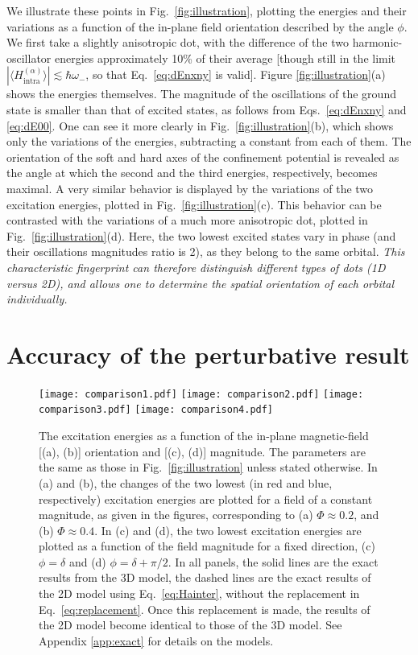 \documentclass[aps,floatfix,twocolumn,showpacs,10pt,nofootinbib]{revtex4-1}
\begin{document}
We illustrate these points in Fig.~\ref{fig:illustration}, plotting the energies and their variations as a function of the in-plane field orientation described by the angle $\phi$. We first take a slightly anisotropic dot, with the difference of the two harmonic-oscillator energies approximately 10\% of their average [though still in the limit $|\langle H^{(\alpha)}_\textrm{intra} \rangle |\lesssim \hbar \omega_-$, so that Eq.~\eqref{eq:dEnxny} is valid]. Figure \ref{fig:illustration}(a) shows the energies themselves. The magnitude of the oscillations of the ground state is smaller than that of excited states, as follows from Eqs.~\eqref{eq:dEnxny} and \eqref{eq:dE00}. One can see it more clearly in Fig.~\ref{fig:illustration}(b), which shows only the variations of the energies, subtracting a constant from each of them. The orientation of the  soft and hard axes of the confinement potential is revealed as the angle at which the second and the third energies, respectively, becomes maximal.
A very similar behavior is displayed by the variations of the two excitation energies, plotted in Fig.~\ref{fig:illustration}(c). This behavior can be contrasted with the variations of a much more anisotropic dot, plotted in Fig.~\ref{fig:illustration}(d). Here, the two lowest excited states vary in phase (and their oscillations magnitudes ratio is 2), as they belong to the same orbital. \textit{This characteristic fingerprint can therefore distinguish different types of dots (1D versus 2D), and allows one to determine the spatial orientation of each orbital individually.\cite{yu}}


\section{Accuracy of the perturbative result}

\begin{figure}
\texttt{[image: comparison1.pdf]}
\texttt{[image: comparison2.pdf]}
\texttt{[image: comparison3.pdf]}
\texttt{[image: comparison4.pdf]}
\caption{\label{fig:comparison}
The excitation energies as a function of the in-plane magnetic-field [(a), (b)] orientation and [(c), (d)] magnitude. The parameters are the same as those in Fig.~\ref{fig:illustration} unless stated otherwise. In (a) and (b), the changes of the two lowest (in red and blue, respectively) excitation energies are plotted for a field of a constant magnitude, as given in the figures, corresponding to (a) $\Phi\approx 0.2$, and (b) $\Phi\approx 0.4$. In (c) and (d), the two lowest excitation energies are plotted as a function of the field magnitude for a fixed direction, (c) $\phi=\delta$ and (d) $\phi=\delta+\pi/2$.
 In all panels, the solid lines are the exact results from the 3D model, the dashed lines are the exact results of the 2D model using Eq.~\eqref{eq:Hainter}, without the replacement in Eq.~\eqref{eq:replacement}. Once this replacement is made, the results of the 2D model become identical to those of the 3D model. See Appendix \ref{app:exact} for details on the models.
}
\end{figure}
\end{document}
